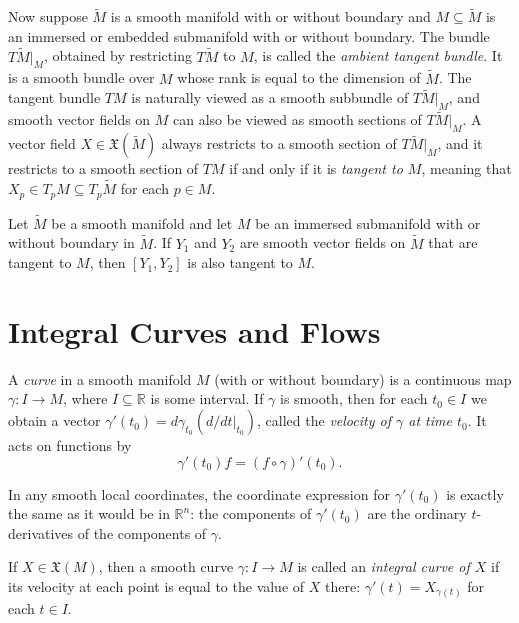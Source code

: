 Now suppose $\tilde{M}$ is a smooth manifold with or without boundary and $M \subseteq \tilde{M}$ is an immersed or embedded submanifold with or without boundary. The bundle $T\tilde{M}|_M$, obtained by restricting $T\tilde{M}$ to $M$, is called the \emph{ambient tangent bundle}. It is a smooth bundle over $M$ whose rank is equal to the dimension of $\tilde{M}$. The tangent bundle $TM$ is naturally viewed as a smooth subbundle of $T\tilde{M}|_M$, and smooth vector fields on $M$ can also be viewed as smooth sections of $T\tilde{M}|_M$. A vector field $X \in \mathfrak{X}(\tilde{M})$ always restricts to a smooth section of $T\tilde{M}|_M$, and it restricts to a smooth section of $TM$ if and only if it is \emph{tangent to $M$}, meaning that $X_p \in T_p M \subseteq T_p \tilde{M}$ for each $p \in M$.

\begin{corollary}
\label{cor:brackets-vector-fields-tangent-to-submanifolds}
Let $\tilde{M}$ be a smooth manifold and let $M$ be an immersed submanifold with or without boundary in $\tilde{M}$. If $Y_1$ and $Y_2$ are smooth vector fields on $\tilde{M}$ that are tangent to $M$, then $[Y_1, Y_2]$ is also tangent to $M$.
\end{corollary}

\section{Integral Curves and Flows}

A \emph{curve} in a smooth manifold $M$ (with or without boundary) is a continuous map $\gamma: I \to M$, where $I \subseteq \mathbb{R}$ is some interval. If $\gamma$ is smooth, then for each $t_0 \in I$ we obtain a vector $\gamma'(t_0) = d\gamma_{t_0}(d/dt|_{t_0})$, called the \emph{velocity of $\gamma$ at time $t_0$}. It acts on functions by
\[
\gamma'(t_0) f = (f \circ \gamma)'(t_0).
\]

In any smooth local coordinates, the coordinate expression for $\gamma'(t_0)$ is exactly the same as it would be in $\mathbb{R}^n$: the components of $\gamma'(t_0)$ are the ordinary $t$-derivatives of the components of $\gamma$.

If $X \in \mathfrak{X}(M)$, then a smooth curve $\gamma: I \to M$ is called an \emph{integral curve of $X$} if its velocity at each point is equal to the value of $X$ there: $\gamma'(t) = X_{\gamma(t)}$ for each $t \in I$.

